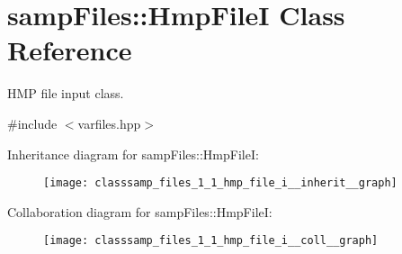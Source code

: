 \hypertarget{classsamp_files_1_1_hmp_file_i}{}\section{samp\+Files\+:\+:Hmp\+FileI Class Reference}
\label{classsamp_files_1_1_hmp_file_i}


H\+MP file input class.  




{\ttfamily \#include $<$varfiles.\+hpp$>$}



Inheritance diagram for samp\+Files\+:\+:Hmp\+FileI\+:\nopagebreak
\begin{figure}[H]
\begin{center}
\leavevmode
\texttt{[image: classsamp\_files\_1\_1\_hmp\_file\_i\_\_inherit\_\_graph]}
\end{center}
\end{figure}


Collaboration diagram for samp\+Files\+:\+:Hmp\+FileI\+:\nopagebreak
\begin{figure}[H]
\begin{center}
\leavevmode
\texttt{[image: classsamp\_files\_1\_1\_hmp\_file\_i\_\_coll\_\_graph]}
\end{center}
\end{figure}

